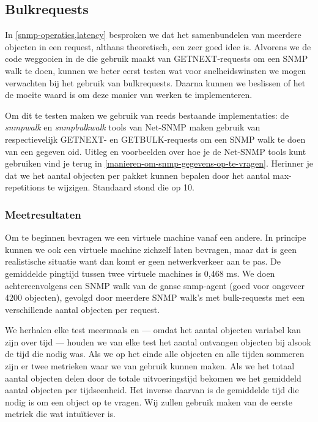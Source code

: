 \subsection{Bulkrequests}
\label{bulkrequests-benchmarks}

In \cref{snmp-operaties,latency} besproken we dat het samenbundelen van meerdere objecten in een request, althans theoretisch, een zeer goed idee is.
Alvorens we de code weggooien in de \nwmretriever{} die gebruik maakt van GETNEXT-requests om een SNMP walk te doen,
kunnen we beter eerst testen wat voor snelheidswinsten we mogen verwachten bij het gebruik van bulkrequests.
Daarna kunnen we beslissen of het de moeite waard is om deze manier van werken te implementeren.

Om dit te testen maken we gebruik van reeds bestaande implementaties:
de \textit{snmpwalk} en \mbox{\textit{snmpbulkwalk}} tools van Net-SNMP maken gebruik van respectievelijk GETNEXT- en
GETBULK-requests om een SNMP walk te doen van een gegeven \gls{oid}.
Uitleg en voorbeelden over hoe je de Net-SNMP tools kunt gebruiken vind je terug in \cref{manieren-om-snmp-gegevens-op-te-vragen}.
Herinner je dat we het aantal objecten per pakket kunnen bepalen door het aantal max-repetitions te wijzigen.
Standaard stond die op 10.

\subsubsection{Meetresultaten}

Om te beginnen bevragen we een virtuele machine vanaf een andere.
In principe kunnen we ook een virtuele machine zichzelf laten bevragen, maar dat is geen realistische situatie want dan komt er geen netwerkverkeer aan te pas.
De gemiddelde pingtijd tussen twee virtuele machines is 0,468 ms.
We doen achtereenvolgens een SNMP walk van de ganse \gls{snmp-agent} (goed voor ongeveer 4200 objecten),
gevolgd door meerdere SNMP walk's met bulk-requests met een verschillende aantal objecten per request.

We herhalen elke test meermaals en --- omdat het aantal objecten variabel kan zijn over tijd ---
houden we van elke test het aantal ontvangen objecten bij alsook de tijd die nodig was.
Als we op het einde alle objecten en alle tijden sommeren zijn er twee metrieken waar we van gebruik kunnen maken.
Als we het totaal aantal objecten delen door de totale uitvoeringstijd bekomen we het gemiddeld aantal objecten per tijdseenheid.
Het inverse daarvan is de gemiddelde tijd die nodig is om een object op te vragen.
Wij zullen gebruik maken van de eerste metriek die wat intuïtiever is.

